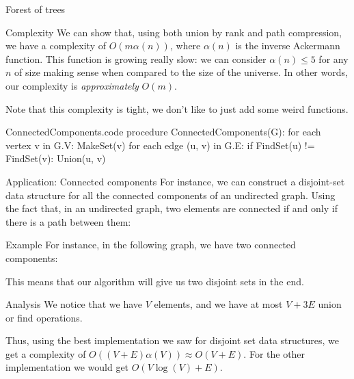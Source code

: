 \documentclass[a4paper]{article}
\begin{document}
\begin{parag}{Forest of trees}
\begin{subparag}{Complexity}
        We can show that, using both union by rank and path compression, we have a complexity of $O\left(m \alpha\left(n\right)\right)$, where $\alpha\left(n\right)$ is the inverse Ackermann function. This function is growing really slow: we can consider $\alpha\left(n\right) \leq 5$ for any $n$ of size making sense when compared to the size of the universe. In other words, our complexity is \textit{approximately} $O\left(m\right)$.

        Note that this complexity is tight, we don't like to just add some weird functions.
    \end{subparag}
\end{parag}

\begin{filecontents*}[overwrite]{ConnectedComponents.code}
procedure ConnectedComponents(G):
    for each vertex v in G.V:
        MakeSet(v)
    for each edge (u, v) in G.E:
        if FindSet(u) != FindSet(v):
            Union(u, v)
\end{filecontents*}

\begin{parag}{Application: Connected components}
    For instance, we can construct a disjoint-set data structure for all the connected components of an undirected graph. Using the fact that, in an undirected graph, two elements are connected if and only if there is a path between them:

    \begin{subparag}{Example}
        For instance, in the following graph, we have two connected components:

        This means that our algorithm will give us two disjoint sets in the end.
    \end{subparag}

    \begin{subparag}{Analysis}
        We notice that we have $V$ elements, and we have at most $V + 3E$ union or find operations.

        Thus, using the best implementation we saw for disjoint set data structures, we get a complexity of $O\left(\left(V + E\right) \alpha\left(V\right)\right) \approx O\left(V + E\right)$. For the other implementation we would get $O\left(V \log\left(V\right) + E\right)$.
    \end{subparag}
\end{parag}
\end{document}
